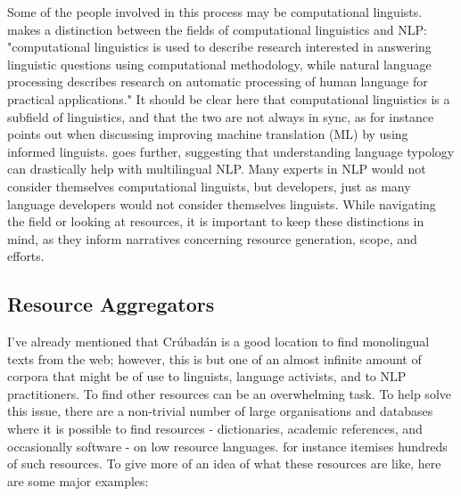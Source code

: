 Some of the people involved in this process may be computational linguists. \citet{bender2016linguistic} makes a distinction between the fields of computational linguistics and NLP: "computational linguistics is used to describe research interested in answering linguistic questions using computational methodology, while natural language processing describes research on automatic processing of human language for practical applications." It should be clear here that computational linguistics is a subfield of linguistics, and that the two are not always in sync, as for instance \citet{kay1997proper} points out when discussing improving machine translation (ML) by using informed linguists. \citet{bender2010grand, bender2016linguistic} goes further, suggesting that understanding language typology can drastically help with multilingual NLP. Many experts in NLP would not consider themselves computational linguists, but developers, just as many language developers would not consider themselves linguists. While navigating the field or looking at resources, it is important to keep these distinctions in mind, as they inform narratives concerning resource generation, scope, and efforts.

\subsection{Resource Aggregators}
\label{subsec:resource-aggregators}

I've already mentioned that Cr\'ubad\'an \citep{scannell2007crubadan} is a good location to find monolingual texts from the web; however, this is but one of an almost infinite amount of corpora that might be of use to linguists, language activists, and to NLP practitioners. To find other resources can be an overwhelming task. To help solve this issue, there are a non-trivial number of large organisations and databases where it is possible to find resources - dictionaries, academic references, and occasionally software - on low resource languages. \citet{unesco11directory} for instance itemises hundreds of such resources. To give more of an idea of what these resources are like, here are some major examples:

